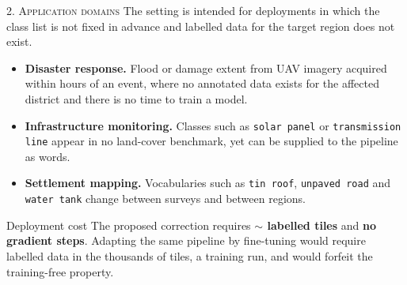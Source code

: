\documentclass[aspectratio=169]{beamer}
\newcommand{\best}[1]{\textcolor{acc}{\textbf{#1}}}
\begin{document}
\begin{frame}{\textsc{2. Application domains}}
\small
The setting is intended for deployments in which the class list is not fixed in
advance and labelled data for the target region does not exist.
\vspace{0.5em}
\begin{itemize}
  \item \textbf{Disaster response.} Flood or damage extent from UAV imagery
        acquired within hours of an event, where no annotated data exists for the
        affected district and there is no time to train a model.
  \vspace{0.3em}
  \item \textbf{Infrastructure monitoring.} Classes such as
        \texttt{solar panel} or \texttt{transmission line} appear in no
        land-cover benchmark, yet can be supplied to the pipeline as words.
  \vspace{0.3em}
  \item \textbf{Settlement mapping.} Vocabularies such as \texttt{tin roof},
        \texttt{unpaved road} and \texttt{water tank} change between surveys and
        between regions.
\end{itemize}
\vspace{0.6em}
\begin{block}{Deployment cost}
The proposed correction requires \best{$\sim$\calibTiles{} labelled tiles} and
\best{no gradient steps}. Adapting the same pipeline by fine-tuning would require
labelled data in the thousands of tiles, a training run, and would forfeit the
training-free property.
\end{block}
\end{frame}

\end{document}

